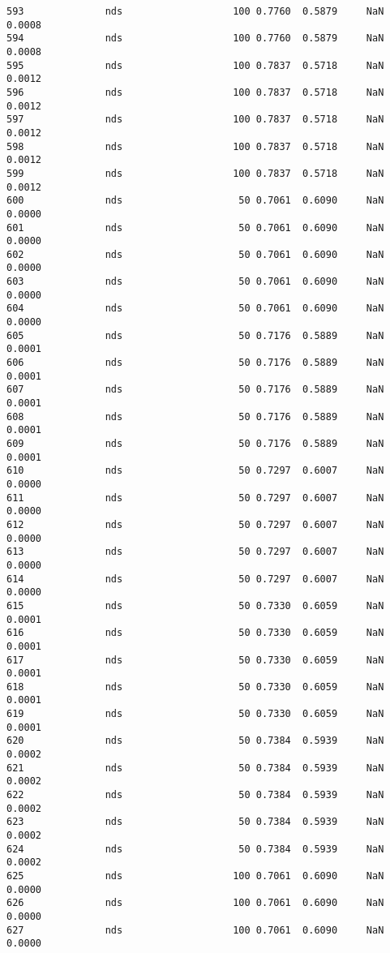 \documentclass[11pt]{article}
\begin{document}
\begin{Verbatim}[commandchars=\\\{\}]
593              nds                   100 0.7760  0.5879     NaN 0.0008   
594              nds                   100 0.7760  0.5879     NaN 0.0008   
595              nds                   100 0.7837  0.5718     NaN 0.0012   
596              nds                   100 0.7837  0.5718     NaN 0.0012   
597              nds                   100 0.7837  0.5718     NaN 0.0012   
598              nds                   100 0.7837  0.5718     NaN 0.0012   
599              nds                   100 0.7837  0.5718     NaN 0.0012   
600              nds                    50 0.7061  0.6090     NaN 0.0000   
601              nds                    50 0.7061  0.6090     NaN 0.0000   
602              nds                    50 0.7061  0.6090     NaN 0.0000   
603              nds                    50 0.7061  0.6090     NaN 0.0000   
604              nds                    50 0.7061  0.6090     NaN 0.0000   
605              nds                    50 0.7176  0.5889     NaN 0.0001   
606              nds                    50 0.7176  0.5889     NaN 0.0001   
607              nds                    50 0.7176  0.5889     NaN 0.0001   
608              nds                    50 0.7176  0.5889     NaN 0.0001   
609              nds                    50 0.7176  0.5889     NaN 0.0001   
610              nds                    50 0.7297  0.6007     NaN 0.0000   
611              nds                    50 0.7297  0.6007     NaN 0.0000   
612              nds                    50 0.7297  0.6007     NaN 0.0000   
613              nds                    50 0.7297  0.6007     NaN 0.0000   
614              nds                    50 0.7297  0.6007     NaN 0.0000   
615              nds                    50 0.7330  0.6059     NaN 0.0001   
616              nds                    50 0.7330  0.6059     NaN 0.0001   
617              nds                    50 0.7330  0.6059     NaN 0.0001   
618              nds                    50 0.7330  0.6059     NaN 0.0001   
619              nds                    50 0.7330  0.6059     NaN 0.0001   
620              nds                    50 0.7384  0.5939     NaN 0.0002   
621              nds                    50 0.7384  0.5939     NaN 0.0002   
622              nds                    50 0.7384  0.5939     NaN 0.0002   
623              nds                    50 0.7384  0.5939     NaN 0.0002   
624              nds                    50 0.7384  0.5939     NaN 0.0002   
625              nds                   100 0.7061  0.6090     NaN 0.0000   
626              nds                   100 0.7061  0.6090     NaN 0.0000   
627              nds                   100 0.7061  0.6090     NaN 0.0000   

\end{Verbatim}
\end{document}
